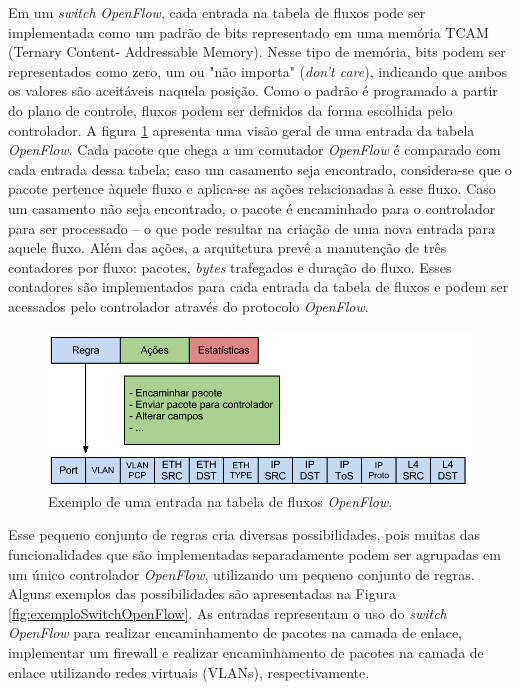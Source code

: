 Em um \textit{switch} \textit{OpenFlow}, cada entrada na tabela de 
fluxos pode ser implementada como um padrão de bits 
representado em uma memória TCAM (Ternary Content-
Addressable Memory). Nesse tipo de memória, bits podem
ser representados como zero, um ou "não importa" 
(\textit{don't care}), indicando que ambos os valores são
aceitáveis naquela posição. Como o padrão é programado
a partir do plano de controle, fluxos podem ser definidos da 
forma escolhida pelo controlador. A figura \ref{fig:fluxoopenflow}
apresenta uma visão geral de uma entrada da tabela \textit{OpenFlow}.
Cada pacote que chega a um comutador \textit{OpenFlow} é comparado
com cada entrada dessa tabela; caso um casamento seja encontrado,
considera-se que o pacote pertence àquele fluxo e aplica-se
as ações relacionadas à esse fluxo. Caso um casamento não
seja encontrado, o pacote é encaminhado para o controlador 
para ser processado -- o que pode resultar na criação de uma
nova entrada para aquele fluxo. Além das ações, a arquitetura
prevê a manutenção de três contadores por fluxo: pacotes,
 \textit{bytes} trafegados e duração do fluxo. Esses contadores são 
implementados para cada entrada da tabela de fluxos e 
podem ser acessados pelo controlador através do protocolo
\textit{OpenFlow}.

\begin{figure}[hb] \centering
\includegraphics[width=160mm]{fluxoOpenflow.png} 
\caption{Exemplo de uma entrada na tabela de fluxos \textit{OpenFlow}.} 
\label{fig:fluxoopenflow} 
\end{figure}

Esse pequeno conjunto de regras cria diversas possibilidades,
pois muitas das funcionalidades que são implementadas 
separadamente podem ser agrupadas em um único controlador
\textit{OpenFlow}, utilizando um pequeno conjunto de regras. Alguns 
exemplos das possibilidades são apresentadas na Figura \ref{fig:exemploSwitchOpenFlow}.
As entradas representam o uso do \textit{switch} \textit{OpenFlow}
para realizar encaminhamento de pacotes na camada de enlace,
implementar um firewall e realizar encaminhamento de pacotes 
na camada de enlace utilizando redes virtuais (VLANs), respectivamente.

